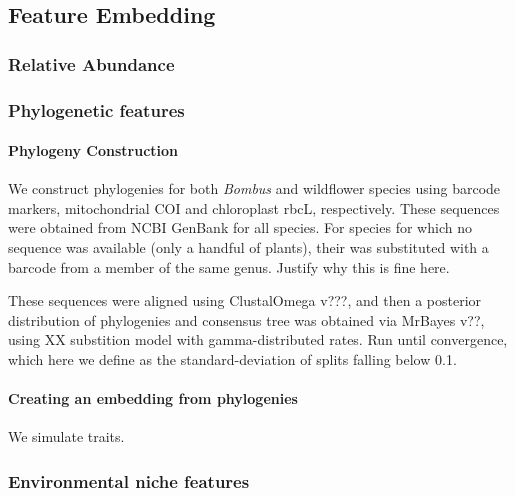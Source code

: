 \documentclass[11pt]{article}
\begin{document}
\hypertarget{feature-embedding}{%
\subsection{Feature Embedding}\label{feature-embedding}}

\hypertarget{relative-abundance}{%
\subsubsection{Relative Abundance}\label{relative-abundance}}

\hypertarget{phylogenetic-features}{%
\subsubsection{Phylogenetic features}\label{phylogenetic-features}}

\hypertarget{phylogeny-construction}{%
\paragraph{Phylogeny Construction}\label{phylogeny-construction}}

We construct phylogenies for both \emph{Bombus} and wildflower species
using barcode markers, mitochondrial COI and chloroplast rbcL,
respectively. These sequences were obtained from NCBI GenBank for all
species. For species for which no sequence was available (only a handful
of plants), their was substituted with a barcode from a member of the
same genus. Justify why this is fine here.

These sequences were aligned using ClustalOmega v???, and then a
posterior distribution of phylogenies and consensus tree was obtained
via MrBayes v??, using XX substition model with gamma-distributed rates.
Run until convergence, which here we define as the standard-deviation of
splits falling below 0.1.

\hypertarget{creating-an-embedding-from-phylogenies}{%
\paragraph{Creating an embedding from
phylogenies}\label{creating-an-embedding-from-phylogenies}}

We simulate traits.

\hypertarget{environmental-niche-features}{%
\subsubsection{Environmental niche
features}\label{environmental-niche-features}}
\end{document}
